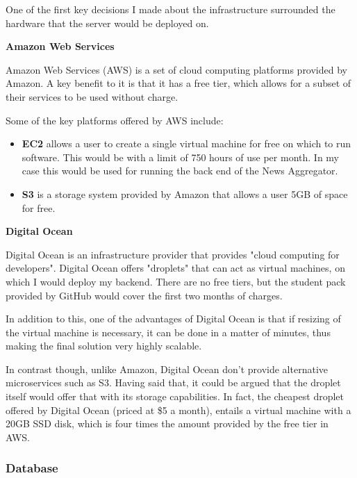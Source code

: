 \documentclass[12pt]{article}
\begin{document}
One of the first key decisions I made about the infrastructure surrounded the hardware that the server would be deployed on.

\textbf{Amazon Web Services}

Amazon Web Services (AWS) is a set of cloud computing platforms provided by Amazon. A key benefit to it is that it has a free tier, which allows for a subset of their services to be used without charge.

Some of the key platforms offered by AWS include: \\

\begin{itemize}
	\item \textbf{EC2} allows a user to create a single virtual machine for free on which to run software. This would be with a limit of 750 hours of use per month. In my case this would be used for running the back end of the News Aggregator. \\
	\item \textbf{S3} is a storage system provided by Amazon that allows a user 5GB of space for free. \\
\end{itemize} 

\textbf{Digital Ocean}

Digital Ocean is an infrastructure provider that provides "cloud computing for developers". Digital Ocean offers "droplets" that can act as virtual machines, on which I would deploy my backend. There are no free tiers, but the student pack provided by GitHub would cover the first two months of charges. 

In addition to this, one of the advantages of Digital Ocean is that if resizing of the virtual machine is necessary, it can be done in a matter of minutes, thus making the final solution very highly scalable.

In contrast though, unlike Amazon, Digital Ocean don't provide alternative microservices such as S3. Having said that, it could be argued that the droplet itself would offer that with its storage capabilities. In fact, the cheapest droplet offered by Digital Ocean (priced at \$5 a month), entails a virtual machine with a 20GB SSD disk, which is four times the amount provided by the free tier in AWS.

\subsubsection{Database}
\end{document}

